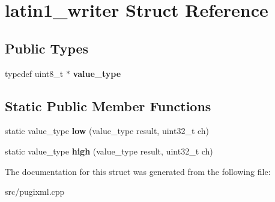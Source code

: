 \hypertarget{structlatin1__writer}{}\section{latin1\+\_\+writer Struct Reference}
\label{structlatin1__writer}
\subsection*{Public Types}
\begin{DoxyCompactItemize}
\item 
\mbox{\label{structlatin1__writer_af9228600fa7eecd793cc3d927d46eb1a}} 
typedef uint8\+\_\+t $\ast$ {\bfseries value\+\_\+type}
\end{DoxyCompactItemize}
\subsection*{Static Public Member Functions}
\begin{DoxyCompactItemize}
\item 
\mbox{\label{structlatin1__writer_ab5d7a833d29d66031420686ca67b1f6e}} 
static value\+\_\+type {\bfseries low} (value\+\_\+type result, uint32\+\_\+t ch)
\item 
\mbox{\label{structlatin1__writer_a0e48c306ebe556f267404a9624f00554}} 
static value\+\_\+type {\bfseries high} (value\+\_\+type result, uint32\+\_\+t ch)
\end{DoxyCompactItemize}


The documentation for this struct was generated from the following file\+:\begin{DoxyCompactItemize}
\item 
src/pugixml.\+cpp\end{DoxyCompactItemize}
